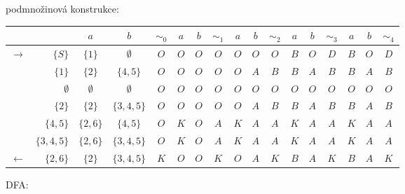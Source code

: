 podmnožinová konstrukce:

  \begin{tabular}{l r | c c || c | c c || c | c c || c | c c || c | c c || c ||
    }


    	&				&	$	a	$	&	$	b	$		&	$	\sim_0	$	&	$	a	$	&	$	b	$	&
        	$	\sim_1	$	&	$	a	$	&	$	b	$	&	$	\sim_2	$	&	$	a	$	&	$	b	$	&
            	$	\sim_3	$	&	$	a	$	&	$	b	$	&	$	\sim_4	$	\\	\hline	\hline
$\rightarrow$	&	$\{	S	\}$	&	$\{	1	\}$	&	$	\emptyset	$		&	$	O	$	&	$	O	$	&	$
	O	$	&	$	O	$	&	$	O	$	&	$	O	$	&	$	O	$	&	$	B	$	&	$	O	$	&	$
    	D	$	&	$	B	$	&	$	O	$	&	$	D	$	\\		
	&	$\{	1	\}$	&	$\{	2	\}$	&	$\{	4,5	\}$		&	$	O	$	&	$	O	$	&	$	O	$	&	$	O
    	$	&	$	O	$	&	$	A	$	&	$	B	$	&	$	B	$	&	$	A	$	&	$	B	$	&	$
        	B	$	&	$	A	$	&	$	B	$	\\		
	&	$	\emptyset	$	&	$	\emptyset	$	&	$	\emptyset	$		&	$	O	$	&	$	O	$	&
    	$	O	$	&	$	O	$	&	$	O	$	&	$	O	$	&	$	O	$	&	$	O	$	&	$	O	$
        	&	$	O	$	&	$	O	$	&	$	O	$	&	$	O	$	\\		
	&	$\{	2	\}$	&	$\{	2	\}$	&	$\{	3,4,5	\}$		&	$	O	$	&	$	O	$	&	$	O	$	&	$
    	O	$	&	$	O	$	&	$	A	$	&	$	B	$	&	$	B	$	&	$	A	$	&	$	B	$	&
        	$	B	$	&	$	A	$	&	$	B	$	\\		
	&	$\{	4,5	\}$	&	$\{	2,6	\}$	&	$\{	4,5	\}$		&	$	O	$	&	$	K	$	&	$	O	$	&	$	A
    	$	&	$	K	$	&	$	A	$	&	$	A	$	&	$	K	$	&	$	A	$	&	$	A	$	&	$
        	K	$	&	$	A	$	&	$	A	$	\\		
	&	$\{	3,4,5	\}$	&	$\{	2,6	\}$	&	$\{	3,4,5	\}$		&	$	O	$	&	$	K	$	&	$	O	$	&
    	$	A	$	&	$	K	$	&	$	A	$	&	$	A	$	&	$	K	$	&	$	A	$	&	$	A	$
        	&	$	K	$	&	$	A	$	&	$	A	$	\\		
$\leftarrow$	&	$\{	2,6	\}$	&	$\{	2	\}$	&	$\{	3,4,5	\}$		&	$	K	$	&	$	O	$	&	$	O
	$	&	$	K	$	&	$	O	$	&	$	A	$	&	$	K	$	&	$	B	$	&	$	A	$	&	$	K
    	$	&	$	B	$	&	$	A	$	&	$	K	$	\\		

   

  \end{tabular}
\vspace*{6mm}

DFA:
\vspace*{2mm}

